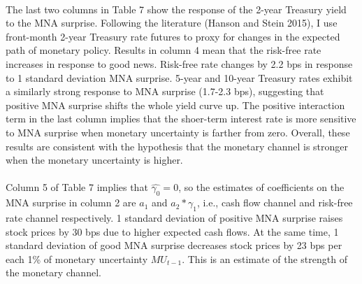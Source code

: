 \documentclass[12pt]{article}
\begin{document}
\paragraph{}
The last two columns in Table 7 show the response of the 2-year Treasury yield to the MNA surprise. Following the literature (Hanson and Stein 2015), I use front-month 2-year Treasury rate futures to proxy for changes in the expected path of monetary policy. Results in column 4 mean that the risk-free rate increases in response to good news. Risk-free rate changes by 2.2 bps in response to 1 standard deviation MNA surprise. 5-year and 10-year Treasury rates exhibit a similarly strong response to MNA surprise (1.7-2.3 bps), suggesting that positive MNA surprise shifts the whole yield curve up. The positive interaction term in the last column implies that the shoer-term interest rate is more sensitive to MNA surprise when monetary uncertainty is farther from zero. Overall, these results are consistent with the hypothesis that the monetary channel is stronger when the monetary uncertainty is higher. 
\paragraph{}
Column 5 of Table 7 implies that $\hat{\gamma_0}=0$, so the estimates of coefficients on the MNA surprise in column 2 are $a_1$ and $a_2*\gamma_1$, i.e., cash flow channel and risk-free rate channel respectively. 1 standard deviation of positive MNA surprise raises stock prices by 30 bps due to higher expected cash flows. At the same time, 1 standard deviation of good MNA surprise decreases stock prices by 23 bps per each 1\% of monetary uncertainty $MU_{t-1}$. This is an estimate of the strength of the monetary channel.
\end{document}
